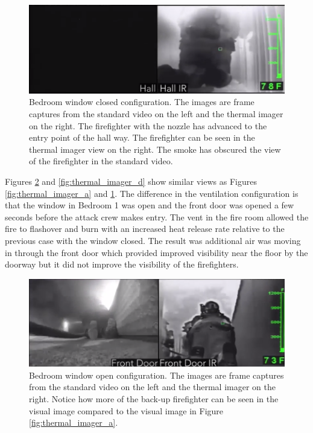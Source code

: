\documentclass[12pt,oneside]{book}
\begin{document}
\begin{figure}[H]
\centering
\includegraphics[width=1.0\textwidth]{../0_Images/Tactical_Considerations/Thermal_Imager/Exp6Hallpair.png}
\caption[Thermal Imager B]{Bedroom window closed configuration.  The images are frame captures from the standard video on the left and the thermal imager on the right. The firefighter with the nozzle has advanced to the entry point of the hall way. The firefighter can be seen in the thermal imager view on the right. The smoke has obscured the view of the firefighter in the standard video.}
\label{fig:thermal_imager_b}
\end{figure}

Figures \ref{fig:thermal_imager_c} and \ref{fig:thermal_imager_d} show similar views as Figures \ref{fig:thermal_imager_a} and \ref{fig:thermal_imager_b}. The difference in the ventilation configuration is that the window in Bedroom 1 was open and the front door was opened a few seconds before the attack crew makes entry.  The vent in the fire room allowed the fire to flashover and burn with an increased heat release rate relative to the previous case with the window closed. The result was additional air was moving in through the front door which provided improved visibility near the floor by the doorway but it did not improve the visibility of the firefighters. 

\begin{figure}[H]
\centering
\includegraphics[width=1.0\textwidth]{../0_Images/Tactical_Considerations/Thermal_Imager/Exp8FDpair.png}
\caption[Thermal Imager C]{Bedroom window open configuration.  The images are frame captures from the standard video on the left and the thermal imager on the right. Notice how more of the back-up firefighter can be seen in the visual image compared to the visual image in Figure \ref{fig:thermal_imager_a}.}
\label{fig:thermal_imager_c}
\end{figure}
\end{document}
